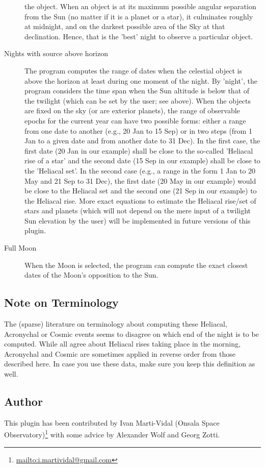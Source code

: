 \begin{description}
  the object. When an object is at its maximum possible angular
  separation from the Sun (no matter if it is a planet or a star), it
  culminates roughly at midnight, and on the darkest possible area of
  the Sky at that declination. Hence, that is the 'best' night to
  observe a particular object.
\item[Nights with source above horizon] The program computes the range
  of dates when the celestial object is above the horizon at least
  during one moment of the night. By 'night', the program considers
  the time span when the Sun altitude is below that of the twilight
  (which can be set by the user; see above). When the objects are
  fixed on the sky (or are exterior planets), the range of observable
  epochs for the current year can have two possible forms: either a
  range from one date to another (e.g., 20 Jan to 15 Sep) or in two
  steps (from 1 Jan to a given date and from another date to 31
  Dec). In the first case, the first date (20 Jan in our example)
  shall be close to the so-called 'Heliacal rise of a star' and the
  second date (15 Sep in our example) shall be close to the 'Heliacal
  set'. In the second case (e.g., a range in the form 1 Jan to 20 May
  and 21 Sep to 31 Dec), the first date (20 May in our example) would
  be close to the Heliacal set and the second one (21 Sep in our
  example) to the Heliacal rise. More exact equations to estimate the
  Heliacal rise/set of stars and planets (which will not depend on the
  mere input of a twilight Sun elevation by the user) will be
  implemented in future versions of this plugin.
\item[Full Moon] When the Moon is selected, the program can compute
  the exact closest dates of the Moon's opposition to the Sun.
\end{description}

\subsection*{Note on Terminology}

The (sparse) literature on terminology about computing these Heliacal, Acronychal or Cosmic events 
seems to disagree on which end of the night is to be computed. While all agree about 
Heliacal rises taking place in the morning, Acronychal and Cosmic are sometimes applied 
in reverse order from those described here. In case you use these data, make sure you 
keep this definition as well. 

\subsection*{Author}
\label{sec:plugins:Observability:author}
This plugin has been contributed by Ivan Marti-Vidal (Onsala Space Observatory)\footnote{\url{mailto:i.martividal@gmail.com}} with some advice by Alexander Wolf and Georg Zotti.





